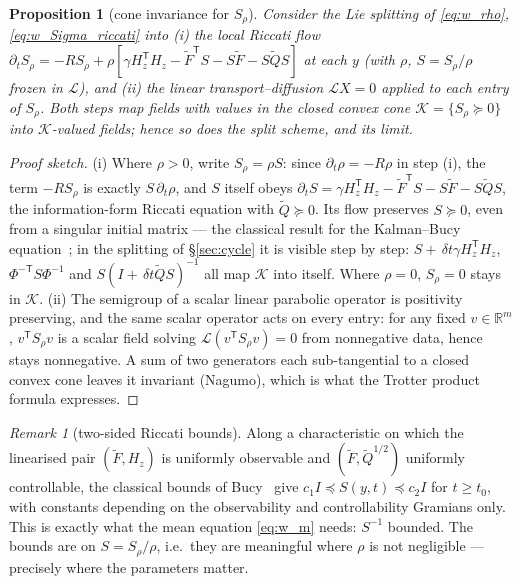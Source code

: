 \documentclass[11pt,a4paper]{article}
\newcommand{\R}{\mathbb{R}}
\newcommand{\T}{^{\mathsf T}}
\newcommand{\Sr}{S_{\rho}}          %
\newcommand{\dt}{\,\delta t}
\theoremstyle{plain}
\newtheorem{proposition}{Proposition}
\theoremstyle{definition}
\theoremstyle{remark}
\newtheorem{remark}{Remark}
\begin{document}
\begin{proposition}[cone invariance for $\Sr$]
Consider the Lie splitting of \eqref{eq:w_rho}, \eqref{eq:w_Sigma_riccati} into (i) the local Riccati flow $\partial_t\Sr = -R\Sr + \rho[\gamma H_z\T H_z - \tilde F\T S - S\tilde F - S\tilde QS]$ at each $y$ (with $\rho$, $S=\Sr/\rho$ frozen in $\mathcal L$), and (ii) the linear transport--diffusion $\mathcal L X = 0$ applied to each entry of $\Sr$. Both steps map fields with values in the closed convex cone $\mathcal K = \{\Sr\succeq0\}$ into $\mathcal K$-valued fields; hence so does the split scheme, and its limit.
\end{proposition}
\begin{proof}[Proof sketch]
(i) Where $\rho>0$, write $\Sr=\rho S$: since $\partial_t\rho=-R\rho$ in step (i), the term $-R\Sr$ is exactly $S\,\partial_t\rho$, and $S$ itself obeys $\partial_tS = \gamma H_z\T H_z - \tilde F\T S - S\tilde F - S\tilde QS$, the information-form Riccati equation with $\tilde Q\succeq0$. Its flow preserves $S\succeq0$, even from a singular initial matrix --- the classical result for the Kalman--Bucy equation~\cite{KalmanBucy1961,Bucy1972}; in the splitting of \S\ref{sec:cycle} it is visible step by step: $S+\dt\gamma H_z\T H_z$, $\Phi^{-\mathsf T}S\Phi^{-1}$ and $S(I+\dt\tilde QS)^{-1}$ all map $\mathcal K$ into itself. Where $\rho=0$, $\Sr=0$ stays in $\mathcal K$. (ii) The semigroup of a scalar linear parabolic operator is positivity preserving, and the same scalar operator acts on every entry: for any fixed $v\in\R^m$, $v\T\Sr v$ is a scalar field solving $\mathcal L(v\T\Sr v)=0$ from nonnegative data, hence stays nonnegative. A sum of two generators each sub-tangential to a closed convex cone leaves it invariant (Nagumo), which is what the Trotter product formula expresses.
\end{proof}

\begin{remark}[two-sided Riccati bounds]
Along a characteristic on which the linearised pair $(\tilde F, H_z)$ is uniformly observable and $(\tilde F,\tilde Q^{1/2})$ uniformly controllable, the classical bounds of Bucy~\cite{Bucy1972} give $c_1I\preceq S(y,t)\preceq c_2I$ for $t\ge t_0$, with constants depending on the observability and controllability Gramians only. This is exactly what the mean equation \eqref{eq:w_m} needs: $S^{-1}$ bounded. The bounds are on $S=\Sr/\rho$, i.e.\ they are meaningful where $\rho$ is not negligible --- precisely where the parameters matter.
\end{remark}
\end{document}
